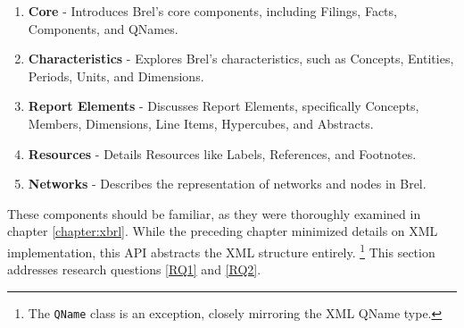 \begin{enumerate}
    \item \textbf{Core} - Introduces Brel's core components, including Filings, Facts, Components, and QNames.
    \item \textbf{Characteristics} - Explores Brel's characteristics, such as Concepts, Entities, Periods, Units, and Dimensions.
    \item \textbf{Report Elements} - Discusses Report Elements, specifically Concepts, Members, Dimensions, Line Items, Hypercubes, and Abstracts.
    \item \textbf{Resources} - Details Resources like Labels, References, and Footnotes.
    \item \textbf{Networks} - Describes the representation of networks and nodes in Brel.
\end{enumerate}

These components should be familiar, as they were thoroughly examined in chapter \ref{chapter:xbrl}. 
While the preceding chapter minimized details on XML implementation, this API abstracts the XML structure entirely.
\footnote{The \texttt{QName} class is an exception, closely mirroring the XML QName type.}
This section addresses research questions \ref{RQ1} and \ref{RQ2}.

